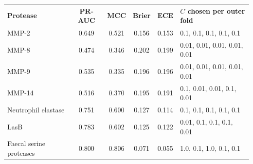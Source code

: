 \begin{tabular}{@{}lccccl@{}}\toprule
Protease & PR-AUC & MCC & Brier & ECE & $C$ chosen per outer fold \\\midrule
MMP-2 & 0.649 & 0.521 & 0.156 & 0.153 & 0.1, 0.1, 0.1, 0.1, 0.1 \\
MMP-8 & 0.474 & 0.346 & 0.202 & 0.199 & 0.01, 0.01, 0.01, 0.01, 0.01 \\
MMP-9 & 0.535 & 0.335 & 0.196 & 0.196 & 0.01, 0.01, 0.01, 0.01, 0.01 \\
MMP-14 & 0.516 & 0.370 & 0.195 & 0.191 & 0.1, 0.01, 0.01, 0.1, 0.01 \\
Neutrophil elastase & 0.751 & 0.600 & 0.127 & 0.114 & 0.1, 0.1, 0.1, 0.1, 0.1 \\
LasB & 0.783 & 0.602 & 0.125 & 0.122 & 0.01, 0.1, 0.1, 0.1, 0.01 \\
Faecal serine proteases & 0.800 & 0.806 & 0.071 & 0.055 & 1.0, 0.1, 1.0, 0.1, 0.1 \\
\bottomrule\end{tabular}

